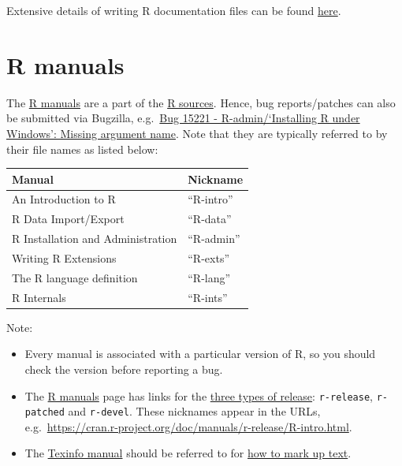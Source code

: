 \documentclass[
]{book}
\providecommand{\tightlist}{%
  \setlength{\itemsep}{0pt}\setlength{\parskip}{0pt}}
\begin{document}
Extensive details of writing R documentation files can be found \href{https://cran.r-project.org/doc/manuals/r-release/R-exts.html\#Writing-R-documentation-files}{here}.

\hypertarget{r-manuals}{%
\section{R manuals}\label{r-manuals}}

The \href{https://cran.r-project.org/manuals.html}{R manuals} are a part of the \href{https://svn.r-project.org/R/trunk/doc/manual/}{R sources}. Hence, bug reports/patches can also be submitted via Bugzilla, e.g.~\href{https://bugs.r-project.org/bugzilla/show_bug.cgi?id=15221}{Bug 15221 - R-admin/`Installing R under Windows': Missing argument name}. Note that they are typically referred to by their file names as listed below:

\begin{longtable}[]{@{}ll@{}}
\toprule()
Manual & Nickname \\
\midrule()
\endhead
An Introduction to R & ``R-intro'' \\
R Data Import/Export & ``R-data'' \\
R Installation and Administration & ``R-admin'' \\
Writing R Extensions & ``R-exts'' \\
The R language definition & ``R-lang'' \\
R Internals & ``R-ints'' \\
\bottomrule()
\end{longtable}

Note:

\begin{itemize}
\tightlist
\item
  Every manual is associated with a particular version of R, so you should check the version before reporting a bug.
\item
  The \href{https://cran.r-project.org/manuals.html}{R manuals} page has links for the \href{https://contributor.r-project.org/rdevguide/GetStart.html\#the-r-source-code}{three types of release}: \texttt{r-release}, \texttt{r-patched} and \texttt{r-devel}. These nicknames appear in the URLs, e.g.~\url{https://cran.r-project.org/doc/manuals/r-release/R-intro.html}.
\item
  The \href{https://www.gnu.org/software/texinfo/}{Texinfo manual} should be referred to for \href{https://www.gnu.org/software/texinfo/manual/texinfo/texinfo.html}{how to mark up text}.
\end{itemize}
\end{document}
